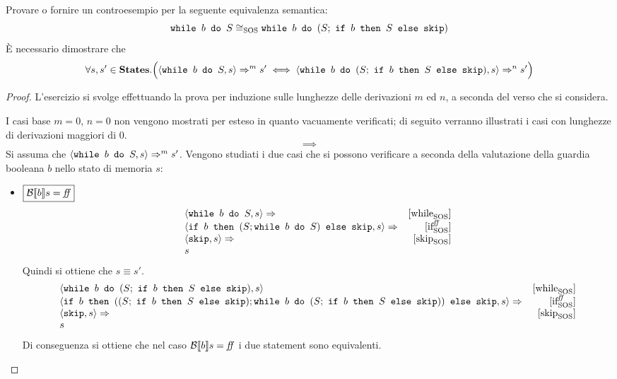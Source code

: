 {
  Provare o fornire un controesempio per la seguente equivalenza semantica: \\
  $$
   \wbS{b}{S} \eqSOS{} \wbS{b}{(S;\ \ifABC{b}{S}{\skipForFriends})}
  $$
}
{
È necessario dimostrare che
$$
\forall s,s' \in \states. 
  \Big(\confSs{\wbS{b}{S}}{s} \Rar{m} s'
  \iff
  \confSs{\wbS{b}{(S;\ \ifABC{b}{S}{\skipForFriends})}}{s} \Rar{n} s' \Big)
$$
}
\begin{proof}
L'esercizio si svolge effettuando la prova per induzione sulle lunghezze delle
derivazioni $m$ ed $n$, a seconda del verso che si considera.

I casi base $m = 0$, $n = 0$ non vengono mostrati per esteso in quanto
vacuamente verificati; di seguito verranno illustrati i casi con lunghezze di
derivazioni maggiori di $0$.
$$
\boxed{\implies}
$$
Si assuma che $\confSs{\wbS{b}{S}}{s} \Rar{m} s'$. Vengono studiati i due casi
che si possono verificare a seconda della valutazione della guardia booleana $b$
nello stato di memoria $s$:
\begin{itemize}
  \item $\boxed{\B{b} = \semfalse}$
  $$
  \begin{array}{lr}
  \confSs{\wbS{b}{S}}{s} \Rar{ } & \whileSOS \\
  \confSs{\ifABC{b}{(S; \wbS{b}{S})}{\skipForFriends}}{s} \Rar{ }& \ifffSOS \\
  \confSs{\skipForFriends}{s} \Rar{} & \skipSOS\\
  s
  \end{array}
  $$
  Quindi si ottiene che $s \equiv{} s'$.
  $$
  \begin{array}{lr}
  \confSs{\wbS{b}{(S;\ \ifABC{b}{S}{\skipForFriends})}}{s} & \whileSOS \\
  \confSs{\ifABC{b}
            {((S;\ \ifABC{b}{S}{\skipForFriends});
              \wbS{b}{(S;\ \ifABC{b}{S}{\skipForFriends})})}
            {\skipForFriends}
         }{s} \Rar{ }& \ifffSOS \\
  \confSs{\skipForFriends}{s} \Rar{} & \skipSOS\\
  s
  \end{array}
  $$
  Di conseguenza si ottiene che nel caso $\B{b} = \semfalse$ i due
  statement sono equivalenti.


\end{itemize}
\end{proof}
